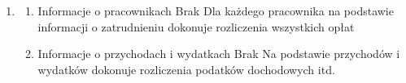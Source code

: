 \documentclass[a4paper,11pt]{article}
\begin{document}
\begin{enumerate}
\begin{enumerate}
\begin{enumerate}
                \end{enumerate}
            \item {}
                \begin{enumerate}
                    \item {} {Informacje o pracownikach} {Brak} {Dla każdego pracownika na podstawie informacji o zatrudnieniu dokonuje rozliczenia wszystkich opłat}
                    \item {} {Informacje o przychodach i wydatkach} {Brak} {Na podstawie przychodów i wydatków dokonuje rozliczenia podatków dochodowych itd.}
                \end{enumerate}
        \end{enumerate}
\end{enumerate}
\end{document}
